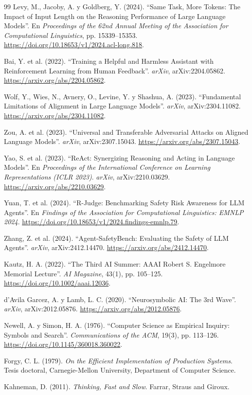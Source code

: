 \begin{thebibliography}{99}
Levy, M., Jacoby, A. y Goldberg, Y. (2024).
``Same Task, More Tokens: The Impact of Input Length on the Reasoning Performance of Large Language Models''.
En \textit{Proceedings of the 62nd Annual Meeting of the Association for Computational Linguistics}, pp. 15339--15353.
\url{https://doi.org/10.18653/v1/2024.acl-long.818}.

Bai, Y. et al. (2022).
``Training a Helpful and Harmless Assistant with Reinforcement Learning from Human Feedback''.
\textit{arXiv}, arXiv:2204.05862.
\url{https://arxiv.org/abs/2204.05862}.

Wolf, Y., Wies, N., Avnery, O., Levine, Y. y Shashua, A. (2023).
``Fundamental Limitations of Alignment in Large Language Models''.
\textit{arXiv}, arXiv:2304.11082.
\url{https://arxiv.org/abs/2304.11082}.

Zou, A. et al. (2023).
``Universal and Transferable Adversarial Attacks on Aligned Language Models''.
\textit{arXiv}, arXiv:2307.15043.
\url{https://arxiv.org/abs/2307.15043}.

Yao, S. et al. (2023).
``ReAct: Synergizing Reasoning and Acting in Language Models''.
En \textit{Proceedings of the International Conference on Learning Representations (ICLR 2023)}.
\textit{arXiv}, arXiv:2210.03629.
\url{https://arxiv.org/abs/2210.03629}.

Yuan, T. et al. (2024).
``R-Judge: Benchmarking Safety Risk Awareness for LLM Agents''.
En \textit{Findings of the Association for Computational Linguistics: EMNLP 2024}.
\url{https://doi.org/10.18653/v1/2024.findings-emnlp.79}.

Zhang, Z. et al. (2024).
``Agent-SafetyBench: Evaluating the Safety of LLM Agents''.
\textit{arXiv}, arXiv:2412.14470.
\url{https://arxiv.org/abs/2412.14470}.

Kautz, H. A. (2022).
``The Third AI Summer: AAAI Robert S. Engelmore Memorial Lecture''.
\textit{AI Magazine}, 43(1), pp. 105--125.
\url{https://doi.org/10.1002/aaai.12036}.

d'Avila Garcez, A. y Lamb, L. C. (2020).
``Neurosymbolic AI: The 3rd Wave''.
\textit{arXiv}, arXiv:2012.05876.
\url{https://arxiv.org/abs/2012.05876}.

Newell, A. y Simon, H. A. (1976).
``Computer Science as Empirical Inquiry: Symbols and Search''.
\textit{Communications of the ACM}, 19(3), pp. 113--126.
\url{https://doi.org/10.1145/360018.360022}.

Forgy, C. L. (1979).
\textit{On the Efficient Implementation of Production Systems}.
Tesis doctoral, Carnegie-Mellon University, Department of Computer Science.

Kahneman, D. (2011).
\textit{Thinking, Fast and Slow}.
Farrar, Straus and Giroux.

\end{thebibliography}
